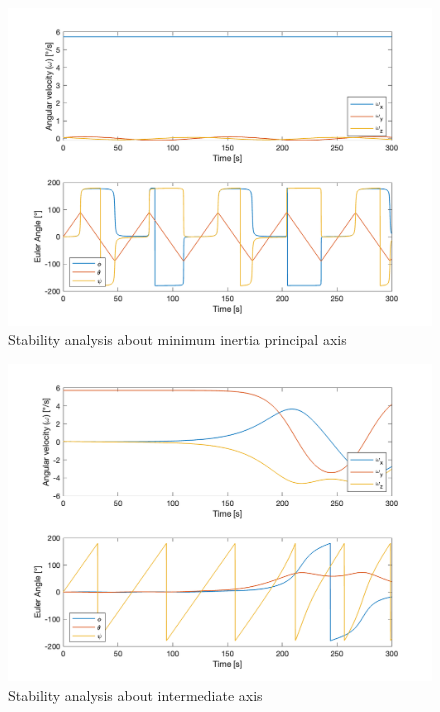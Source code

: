 \begin{figure}[H]
\centering
\includegraphics[scale=0.6]{Images/ps4_problem3c_x.png}
\caption{Stability analysis about minimum inertia principal axis}
\label{fig:ps4_problem3c_x.png}
\end{figure}

\begin{figure}[H]
\centering
\includegraphics[scale=0.6]{Images/ps4_problem3c_y.png}
\caption{Stability analysis about intermediate axis}
\label{fig:ps4_problem3c_y.png}
\end{figure}

